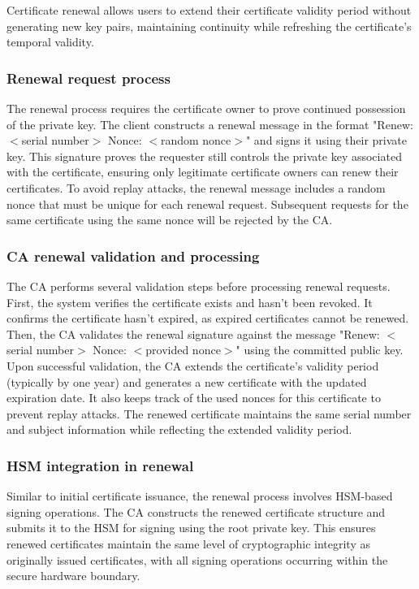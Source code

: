 Certificate renewal allows users to extend their certificate validity period 
without generating new key pairs, maintaining continuity while refreshing 
the certificate's temporal validity.

\subsubsection{Renewal request process}
The renewal process requires the certificate owner to prove continued possession 
of the private key. The client constructs a renewal message in the format 
"Renew: $<$serial number$>$ Nonce: $<$random nonce$>$" and signs it using their 
private key.
This signature proves the requester still controls the private key associated 
with the certificate, ensuring only legitimate certificate owners can renew 
their certificates. To avoid replay attacks, the renewal message includes a 
random nonce that must be unique for each renewal request. Subsequent requests 
for the same certificate using the same nonce will be rejected by the CA.

\subsubsection{CA renewal validation and processing}

The CA performs several validation steps before processing renewal requests.
First, the system verifies the certificate exists and hasn't been revoked. It confirms 
the certificate hasn't expired, as expired certificates cannot be renewed. 
Then, the CA validates the renewal signature against the message "Renew: $<$serial number$>$ Nonce: 
$<$provided nonce$>$" using the committed public key.
Upon successful validation, the CA extends the certificate's validity period 
(typically by one year) and generates a new certificate with the updated expiration 
date. It also keeps track of the used nonces for this certificate to prevent 
replay attacks.
The renewed certificate maintains the same serial number and subject 
information while reflecting the extended validity period.

\subsubsection{HSM integration in renewal}

Similar to initial certificate issuance, the renewal process involves HSM-based 
signing operations. The CA constructs the renewed certificate structure and 
submits it to the HSM for signing using the root private key.
This ensures renewed certificates maintain the same level of cryptographic 
integrity as originally issued certificates, with all signing operations 
occurring within the secure hardware boundary.

